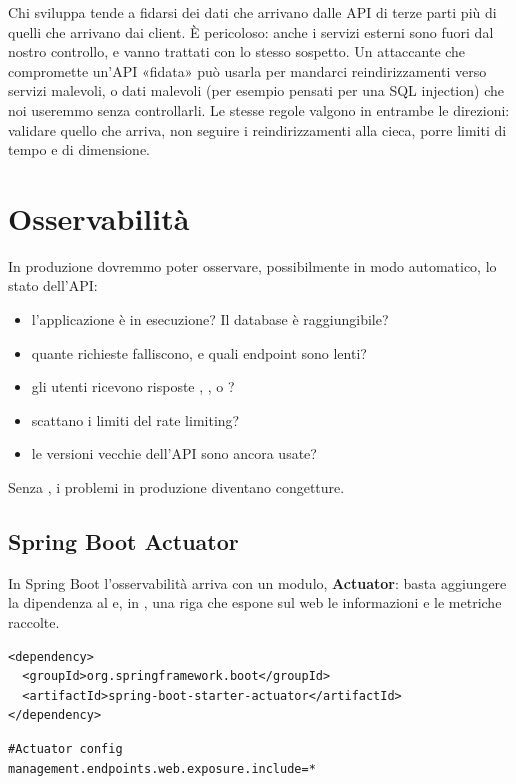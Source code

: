 Chi sviluppa tende a fidarsi dei dati che arrivano dalle API di terze parti più
di quelli che arrivano dai client. È pericoloso: anche i servizi esterni sono
fuori dal nostro controllo, e vanno trattati con lo stesso sospetto. Un
attaccante che compromette un'API «fidata» può usarla per mandarci
reindirizzamenti verso servizi malevoli, o dati malevoli (per esempio pensati
per una SQL injection) che noi useremmo senza controllarli. Le stesse regole
valgono in entrambe le direzioni: validare quello che arriva, non seguire i
reindirizzamenti alla cieca, porre limiti di tempo e di dimensione.

\section{Osservabilità}

In produzione dovremmo poter osservare, possibilmente in modo automatico, lo
stato dell'API:

\begin{itemize}
  \item l'applicazione è in esecuzione? Il database è raggiungibile?
  \item quante richieste falliscono, e quali endpoint sono lenti?
  \item gli utenti ricevono risposte , ,  o
        ?
  \item scattano i limiti del rate limiting?
  \item le versioni vecchie dell'API sono ancora usate?
\end{itemize}

Senza , i problemi in produzione diventano congetture.

\subsection{Spring Boot Actuator}

In Spring Boot l'osservabilità arriva con un modulo, \textbf{Actuator}: basta
aggiungere la dipendenza al  e, in
, una riga che espone sul web le informazioni e le
metriche raccolte.

\begin{affianco}[0.6]
\codicepiccolo
\begin{lstlisting}[style=xml, name=pom.xml]
<dependency>
  <groupId>org.springframework.boot</groupId>
  <artifactId>spring-boot-starter-actuator</artifactId>
</dependency>
\end{lstlisting}
\risultato
\codicepiccolo
\begin{lstlisting}[style=plain, name=application.properties]
#Actuator config
management.endpoints.web.exposure.include=*
\end{lstlisting}
\end{affianco}

